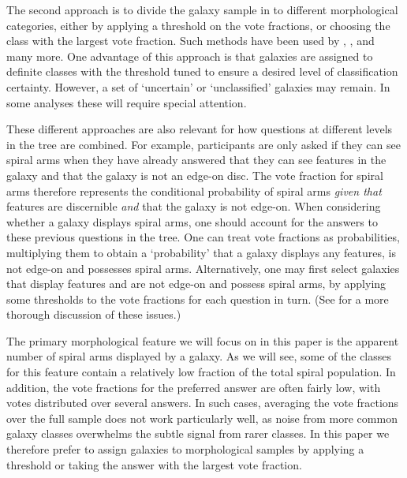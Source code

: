 \documentclass[useAMS,usenatbib]{mn2e}
\begin{document}
The second approach is to divide the galaxy sample in to different morphological categories, either by applying a threshold on the vote fractions, or choosing the class with the largest vote fraction. Such methods have been used by \citet{Land_08}, \citet{Skibba_09}, and many more.  One advantage of this approach is that galaxies are assigned to definite classes with the threshold tuned to ensure a desired level of classification certainty.  However, a set of `uncertain' or `unclassified' galaxies may remain.  In some analyses these will require special attention.

These different approaches are also relevant for how questions at different levels in the tree are combined.  For example, participants are only asked if they can see spiral arms when they have already answered that they can see features in the galaxy and that the galaxy is not an edge-on disc.  The vote fraction for spiral arms therefore represents the conditional probability of spiral arms \emph{given that} features are discernible \emph{and} that the galaxy is not edge-on. When considering whether a galaxy displays spiral arms, one should account for the answers to these previous questions in the tree.  One can treat vote fractions as probabilities, multiplying them to obtain a `probability' that a galaxy displays any features, is not edge-on and possesses spiral arms.  Alternatively, one may first select galaxies that display features and are not edge-on and possess spiral arms, by applying some thresholds to the vote fractions for each question in turn. (See \citealt{Casteels_13} for a more thorough discussion of these issues.)

The primary morphological feature we will focus on in this paper is the apparent number of spiral arms displayed by a galaxy.  As we will see, some of the classes for this feature contain a relatively low fraction of the total spiral population.  In addition, the vote fractions for the preferred answer are often fairly low, with votes distributed over several answers.  In such cases, averaging the vote fractions over the full sample does not work particularly well, as noise from more common galaxy classes overwhelms the subtle signal from rarer classes.  In this paper we therefore prefer to assign galaxies to morphological samples by applying a threshold or taking the answer with the largest vote fraction.

\end{document}
